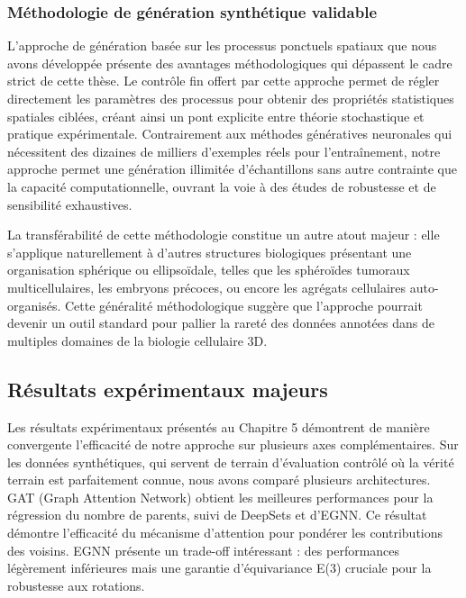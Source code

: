 \subsubsection{Méthodologie de génération synthétique validable}

L'approche de génération basée sur les processus ponctuels spatiaux que nous avons développée présente des avantages méthodologiques qui dépassent le cadre strict de cette thèse. Le contrôle fin offert par cette approche permet de régler directement les paramètres des processus pour obtenir des propriétés statistiques spatiales ciblées, créant ainsi un pont explicite entre théorie stochastique et pratique expérimentale. Contrairement aux méthodes génératives neuronales qui nécessitent des dizaines de milliers d'exemples réels pour l'entraînement, notre approche permet une génération illimitée d'échantillons sans autre contrainte que la capacité computationnelle, ouvrant la voie à des études de robustesse et de sensibilité exhaustives. 

La transférabilité de cette méthodologie constitue un autre atout majeur : elle s'applique naturellement à d'autres structures biologiques présentant une organisation sphérique ou ellipsoïdale, telles que les sphéroïdes tumoraux multicellulaires, les embryons précoces, ou encore les agrégats cellulaires auto-organisés. Cette généralité méthodologique suggère que l'approche pourrait devenir un outil standard pour pallier la rareté des données annotées dans de multiples domaines de la biologie cellulaire 3D.

\subsection{Résultats expérimentaux majeurs}

Les résultats expérimentaux présentés au Chapitre 5 démontrent de manière convergente l'efficacité de notre approche sur plusieurs axes complémentaires. Sur les données synthétiques, qui servent de terrain d'évaluation contrôlé où la vérité terrain est parfaitement connue, nous avons comparé plusieurs architectures. GAT (Graph Attention Network) obtient les meilleures performances pour la régression du nombre de parents, suivi de DeepSets et d'EGNN. Ce résultat démontre l'efficacité du mécanisme d'attention pour pondérer les contributions des voisins. EGNN présente un trade-off intéressant : des performances légèrement inférieures mais une garantie d'équivariance E(3) cruciale pour la robustesse aux rotations.

